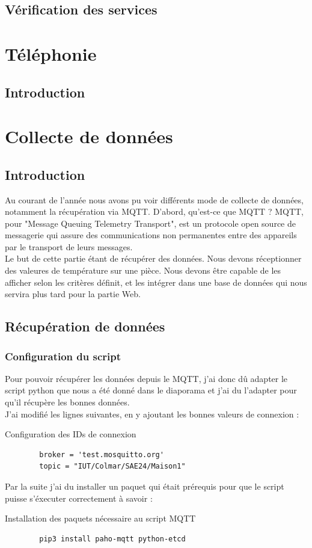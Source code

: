 \documentclass[12pt, a4paper]{article}
\begin{document}
	\subsection{Vérification des services}




\newpage
\section{Téléphonie}
\subsection{Introduction}


\newpage
\section{Collecte de données}
\subsection{Introduction}
Au courant de l'année nous avons pu voir différents mode de collecte de
données, notamment la récupération via MQTT. D'abord, qu'est-ce que MQTT ?
MQTT, pour "Message Queuing Telemetry Transport", est un protocole
open source de messagerie qui assure des communications non permanentes
entre des appareils par le transport de leurs messages.\\
Le but de cette partie étant de récupérer des données. Nous devons réceptionner
des valeures de température sur une pièce. Nous devons être capable de
les afficher selon les critères définit, et les intégrer dans une base de
données qui nous servira plus tard pour la partie Web. 
	\subsection{Récupération de données}
		\subsubsection{Configuration du script}
		Pour pouvoir récupérer les données depuis le MQTT, j'ai donc dû
		adapter le script python que nous a été donné dans le diaporama
		et j'ai du l'adapter pour qu'il récupère les bonnes données.\\ 
		J'ai modifié les lignes suivantes, en y ajoutant les bonnes valeurs
		de connexion :
		\begin{listing}[H]
			\caption{Configuration des IDs de connexion}
			\label{lst:id}
			\begin{verbatim}
		broker = 'test.mosquitto.org'
		topic = "IUT/Colmar/SAE24/Maison1"
			\end{verbatim}
		\end{listing}
		Par la suite j'ai du installer un paquet qui était prérequis 
		pour que le script puisse s'éxecuter correctement à savoir :
		\begin{listing}[H]
			\caption{Installation des paquets nécessaire au script MQTT}
			\label{lst:paho}
			\begin{verbatim}
		pip3 install paho-mqtt python-etcd
			\end{verbatim}
		\end{listing}
		\newpage
\end{document}
